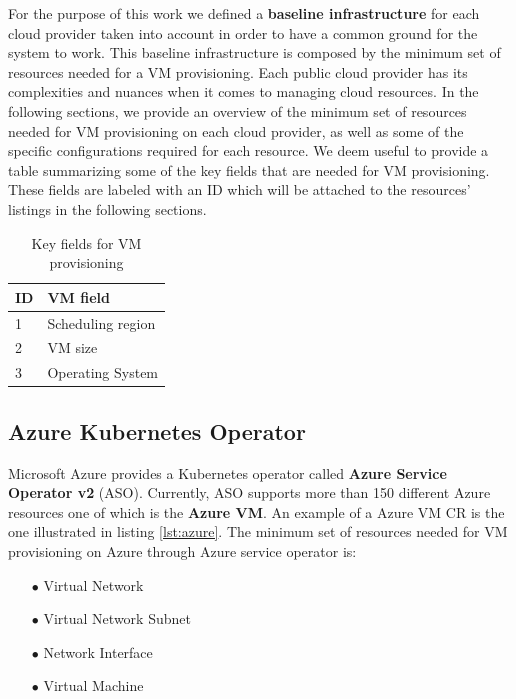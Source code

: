 For the purpose of this work we defined a \textbf{baseline infrastructure} for each cloud provider taken into account in order to have a common ground for the system to work. 
This baseline infrastructure is composed by the minimum set of resources needed for a VM provisioning.
Each public cloud provider has its complexities and nuances when it comes to managing cloud resources.
In the following sections, we provide an overview of the minimum set of resources needed for VM provisioning on each cloud provider, as well as some of the specific configurations required for each resource.
We deem useful to provide a table summarizing some of the key fields that are needed for VM provisioning.
These fields are labeled with an ID which will be attached to the resources' listings in the following sections.

\begin{table}[H]
  \centering
  \begin{tabular}{|l|l|}
  \hline
  \textbf{ID} & \textbf{VM field} \\ \hline
  1           & Scheduling region \\ \hline
  2           & VM size           \\ \hline
  3           & Operating System           \\ \hline
  \end{tabular}
  \caption{Key fields for VM provisioning}
  \label{tab:vm_fields}
\end{table}

\subsection{Azure Kubernetes Operator}

Microsoft Azure provides a Kubernetes operator called \textbf{Azure Service Operator v2} (ASO).
Currently, ASO supports more than 150 different Azure resources one of which is the \textbf{Azure VM}.
An example of a Azure VM CR is the one illustrated in listing \ref{lst:azure}.
The minimum set of resources needed for VM provisioning on Azure through Azure service operator is:

\begin{itemize}[itemsep=0.2pt, topsep=1pt] 
\item[$\bullet$] Virtual Network 
\item[$\bullet$] Virtual Network Subnet
\item[$\bullet$] Network Interface
\item[$\bullet$] Virtual Machine
\end{itemize}

